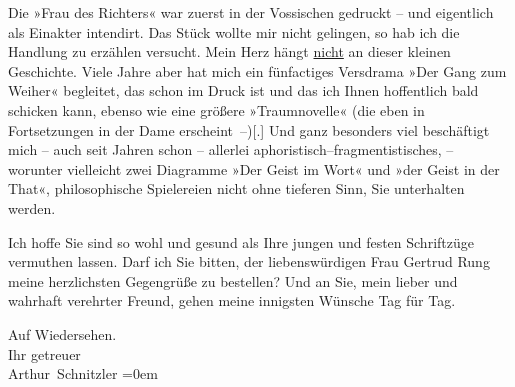 \pstart
           Die »Frau des Richters« war zuerst in der Vossischen gedruckt – und eigentlich als Einakter
               intendirt. Das Stück wollte mir nicht gelingen, so hab ich die Handlung zu erzählen
               versucht. Mein Herz hängt \uline{nicht} an dieser kleinen
               Geschichte. Viele Jahre aber hat mich ein fünfactiges Versdrama »Der Gang zum Weiher« begleitet, das schon im Druck ist und das
               ich Ihnen hoffentlich bald schicken kann, ebenso wie eine größere »Traumnovelle« (die eben in Fortsetzungen in der
                  Dame erscheint –){[}.{]}{ }{\pb}Und ganz besonders viel beschäftigt mich – auch
               seit Jahren schon – allerlei aphoristisch–fragmentistisches, – worunter vielleicht
               zwei Diagramme »Der Geist im Wort« und »der Geist in
                  der That«, philosophische Spielereien nicht ohne tieferen Sinn, Sie
               unterhalten werden.\pend
           
\pstart
           Ich hoffe Sie sind so wohl und gesund als Ihre jungen und festen Schriftzüge
               vermuthen lassen. Darf ich Sie bitten, der liebenswürdigen Frau Gertrud Rung meine herzlichsten Gegengrüße zu bestellen? Und an
               Sie, mein lieber und wahrhaft verehrter Freund, gehen meine innigsten Wünsche {\pb}Tag für Tag.\pend
           
\pstart
           Auf Wiedersehen.{\\[\baselineskip]}Ihr getreuer{\\[\baselineskip]}\spacefill\mbox{Arthur Schnitzler}\pend
           \leftskip=0em{}\endnumbering{}  \newcommand{\dateiname}{L02465}\newcommand{\titel}{Arthur Schnitzler an Georg Brandes, 3. 1. 1926}\newcommand{\editorInnen}{Martin Anton Müller und Gerd-Hermann Susen}
